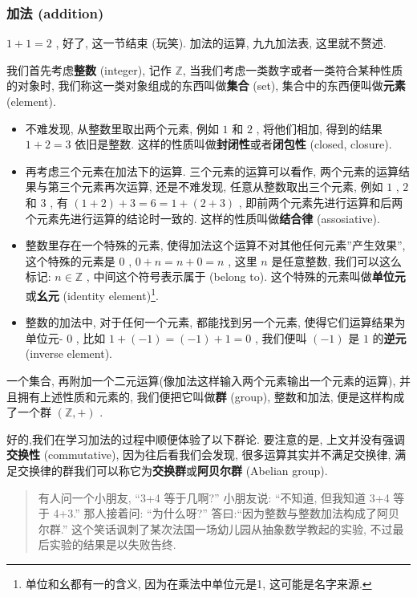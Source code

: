 \hypertarget{ux52a0ux6cd5-addition}{%
\subsubsection{加法 (addition)}\label{ux52a0ux6cd5-addition}}

\(1+1=2\) , 好了, 这一节结束 (玩笑). 加法的运算, 九九加法表,
这里就不赘述.

我们首先考虑\textbf{整数} (integer), 记作 \(\mathbb{Z}\),
当我们考虑一类数字或者一类符合某种性质的对象时,
我们称这一类对象组成的东西叫做\textbf{集合} (set),
集合中的东西便叫做\textbf{元素} (element).

\begin{itemize}
\tightlist
\item
  不难发现, 从整数里取出两个元素, 例如 \(1\) 和 \(2\) , 将他们相加,
  得到的结果 \(1+2=3\) 依旧是整数.
  这样的性质叫做\textbf{封闭性}或者\textbf{闭包性} (closed, closure).
\item
  再考虑三个元素在加法下的运算. 三个元素的运算可以看作,
  两个元素的运算结果与第三个元素再次运算, 还是不难发现,
  任意从整数取出三个元素, 例如 \(1\) , \(2\) 和 \(3\) , 有
  \((1+2)+3=6=1+(2+3)\) ,
  即前两个元素先进行运算和后两个元素先进行运算的结论时一致的.
  这样的性质叫做\textbf{结合律} (assosiative).
\item
  整数里存在一个特殊的元素,
  使得加法这个运算不对其他任何元素''产生效果'', 这个特殊的元素是 \(0\) ,
  \(0+n=n+0=n\) , 这里 \(n\) 是任意整数, 我们可以这么标记:
  \(n\in\mathbb{Z}\) , 中间这个符号表示属于 (belong to).
  这个特殊的元素叫做\textbf{单位元}或\textbf{幺元} (identity
  element)\footnote{单位和幺都有一的含义, 因为在乘法中单位元是1,
    这可能是名字来源.}.
\item
  整数的加法中, 对于任何一个元素, 都能找到另一个元素,
  使得它们运算结果为单位元- \(0\) , 比如 \(1+(−1)=(−1)+1=0\) , 我们便叫
  \((−1)\) 是 \(1\) 的\textbf{逆元} (inverse element).
\end{itemize}

一个集合, 再附加一个二元运算(像加法这样输入两个元素输出一个元素的运算),
并且拥有上述性质和元素的, 我们便把它叫做\textbf{群} (group), 整数和加法,
便是这样构成了一个群 \((\mathbb{Z},+)\) .

好的,我们在学习加法的过程中顺便体验了以下群论. 要注意的是,
上文并没有强调\textbf{交换性} (commutative), 因为往后看我们会发现,
很多运算其实并不满足交换律,
满足交换律的群我们可以称它为\textbf{交换群}或\textbf{阿贝尔群} (Abelian
group).

\begin{quote}
有人问一个小朋友, ``3+4 等于几啊?'' 小朋友说: ``不知道, 但我知道 3+4
等于 4+3.'' 那人接着问: ``为什么呀?''
答曰:``因为整数与整数加法构成了阿贝尔群.''
这个笑话讽刺了某次法国一场幼儿园从抽象数学教起的实验,
不过最后实验的结果是以失败告终.
\end{quote}

